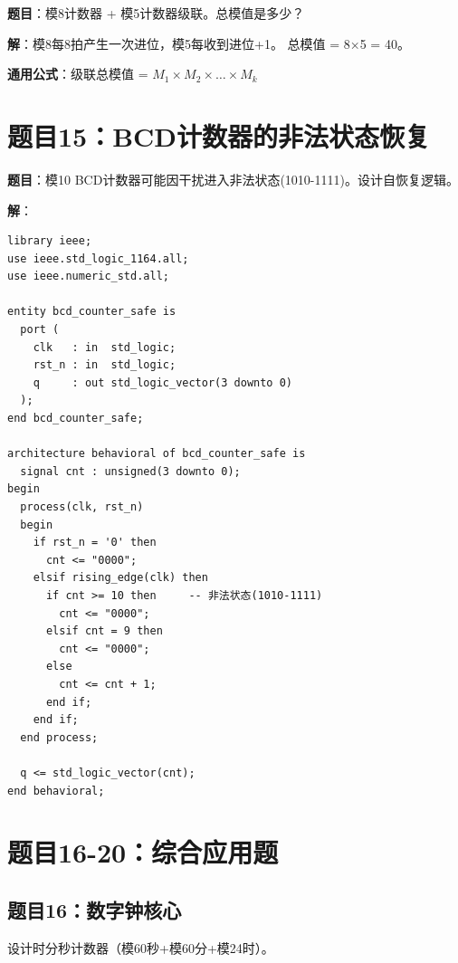 \textbf{题目}：模8计数器 + 模5计数器级联。总模值是多少？

\textbf{解}：模8每8拍产生一次进位，模5每收到进位+1。
总模值 = 8×5 = 40。

\textbf{通用公式}：级联总模值 = $M_1 \times M_2 \times \dots \times M_k$

\section*{题目15：BCD计数器的非法状态恢复}

\textbf{题目}：模10 BCD计数器可能因干扰进入非法状态(1010-1111)。设计自恢复逻辑。

\textbf{解}：
\begin{lstlisting}[caption={自恢复BCD计数器（非法状态检测）}]
library ieee;
use ieee.std_logic_1164.all;
use ieee.numeric_std.all;

entity bcd_counter_safe is
  port (
    clk   : in  std_logic;
    rst_n : in  std_logic;
    q     : out std_logic_vector(3 downto 0)
  );
end bcd_counter_safe;

architecture behavioral of bcd_counter_safe is
  signal cnt : unsigned(3 downto 0);
begin
  process(clk, rst_n)
  begin
    if rst_n = '0' then
      cnt <= "0000";
    elsif rising_edge(clk) then
      if cnt >= 10 then     -- 非法状态(1010-1111)
        cnt <= "0000";
      elsif cnt = 9 then
        cnt <= "0000";
      else
        cnt <= cnt + 1;
      end if;
    end if;
  end process;

  q <= std_logic_vector(cnt);
end behavioral;
\end{lstlisting}

\section*{题目16-20：综合应用题}

\subsection*{题目16：数字钟核心}
设计时分秒计数器（模60秒+模60分+模24时）。

